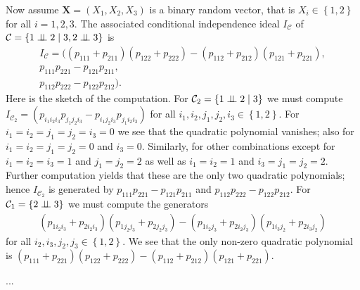 \begin{eg}
  Now assume \( \mathbf X = (X_1, X_2, X_3) \) is a binary random vector, that is \( X_i \in \left\{ 1,2 \right\} \) for all \( i=1,2,3 \). The associated conditional independence ideal \( I_{\mathcal{C}} \) of \( \mathcal{C} = \left\{ 1 \perp \!\!\! \perp 2 \mid 3, 2 \perp \!\!\! \perp 3 \right\} \) is 
  \begin{gather*}
    I_{\mathcal{C}} = ( (p_{111}+p_{211})(p_{122} + p_{222}) - (p_{112} + p_{212})(p_{121} + p_{221}),\\
    p_{111}p_{221} - p_{121}p_{211},\\
    p_{112}p_{222} - p_{122}p_{212}  ).
  \end{gather*}
  Here is the sketch of the computation. For \( \mathcal{C}_2 = \left\{ 1 \perp \!\!\! \perp 2 \mid 3 \right\} \) we must compute \( I_{{\mathcal{C}_2}} = \left( p_{i_1i_2i_3} p_{j_1j_2i_3} - p_{i_1j_2i_3} p_{j_1i_2i_3} \right) \) for all \( i_1,i_2,j_1,j_2,i_3 \in \left\{ 1,2 \right\} \). For \( i_1 = i_2 = j_1 = j_2 = i_3 = 0 \) we see that the quadratic polynomial vanishes; also for \( i_1 = i_2 = j_1 = j_2 = 0 \) and \( i_3 = 0 \). Similarly, for other combinations except for \( i_1 = i_2 = i_3 = 1 \) and \( j_1 = j_2 = 2 \) as well as \( i_1 = i_2 = 1 \) and \( i_3 = j_1 = j_2 = 2 \). Further computation yields that these are the only two quadratic polynomials; hence \( I_{\mathcal{C}_2} \) is generated by \( p_{111}p_{221} - p_{121}p_{211}\) and \(p_{112}p_{222} - p_{122}p_{212} \). For \( \mathcal{C}_1 = \left\{ 2 \perp \!\!\! \perp 3 \right\} \) we must compute the generators 
  \begin{align*}
    (p_{1i_2i_3}+ p_{2i_2i_3})(p_{1j_2j_3}+p_{2j_2j_3}) - (p_{1i_2j_3}+p_{2i_2j_3})(p_{1i_3j_2} + p_{2i_3j_2})
  \end{align*}
  for all \( i_2,i_3,j_2,j_3 \in \left\{ 1,2 \right\} \). We see that the only non-zero quadratic polynomial is \( (p_{111}+p_{221})(p_{122} + p_{222}) - (p_{112} + p_{212})(p_{121} + p_{221}) \).

  ...
\end{eg}